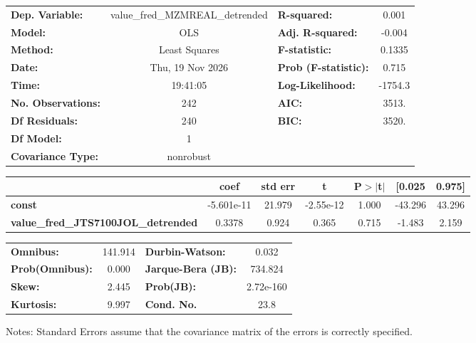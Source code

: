 \begin{center}
\begin{tabular}{lclc}
\toprule
\textbf{Dep. Variable:}                     & value\_fred\_MZMREAL\_detrended & \textbf{  R-squared:         } &     0.001   \\
\textbf{Model:}                             &               OLS               & \textbf{  Adj. R-squared:    } &    -0.004   \\
\textbf{Method:}                            &          Least Squares          & \textbf{  F-statistic:       } &    0.1335   \\
\textbf{Date:}                              &         Thu, 19 Nov 2026        & \textbf{  Prob (F-statistic):} &    0.715    \\
\textbf{Time:}                              &             19:41:05            & \textbf{  Log-Likelihood:    } &   -1754.3   \\
\textbf{No. Observations:}                  &                 242             & \textbf{  AIC:               } &     3513.   \\
\textbf{Df Residuals:}                      &                 240             & \textbf{  BIC:               } &     3520.   \\
\textbf{Df Model:}                          &                   1             & \textbf{                     } &             \\
\textbf{Covariance Type:}                   &            nonrobust            & \textbf{                     } &             \\
\bottomrule
\end{tabular}
\begin{tabular}{lcccccc}
                                            & \textbf{coef} & \textbf{std err} & \textbf{t} & \textbf{P$> |$t$|$} & \textbf{[0.025} & \textbf{0.975]}  \\
\midrule
\textbf{const}                              &   -5.601e-11  &       21.979     & -2.55e-12  &         1.000        &      -43.296    &       43.296     \\
\textbf{value\_fred\_JTS7100JOL\_detrended} &       0.3378  &        0.924     &     0.365  &         0.715        &       -1.483    &        2.159     \\
\bottomrule
\end{tabular}
\begin{tabular}{lclc}
\textbf{Omnibus:}       & 141.914 & \textbf{  Durbin-Watson:     } &     0.032  \\
\textbf{Prob(Omnibus):} &   0.000 & \textbf{  Jarque-Bera (JB):  } &   734.824  \\
\textbf{Skew:}          &   2.445 & \textbf{  Prob(JB):          } & 2.72e-160  \\
\textbf{Kurtosis:}      &   9.997 & \textbf{  Cond. No.          } &      23.8  \\
\bottomrule
\end{tabular}
\end{center}

Notes: \newline
 [1] Standard Errors assume that the covariance matrix of the errors is correctly specified.